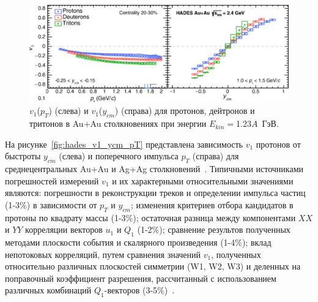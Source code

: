 \begin{figure}[h]
\begin{center}
\includegraphics[width=0.75\linewidth]{images/HADES_prl.png}
\caption{$v_1$($p_T$) (слева) и  $v_1$($y_{cm}$) (справа)  для протонов, дейтронов и тритонов  в  Au+Au столкновениях при
  энергии $E_{kin}=$1.23$A$~ГэВ.}
\label{fig:hades_prl}
\end{center}
\end{figure}

На рисунке~\ref{fig:hades_v1_ycm_pT} представлена зависимость  $v_1$ протонов от быстроты  $y_{cm}$  (слева) и поперечного импульса $p_T$ (справа) для среднецентральных Au+Au  и  Ag+Ag  столкновений~\cite{Mamaev:2024-1, Mamaev:2024-2}. 
Типичными источниками погрешностей измерений $v_1$ и их характерными относительными значениями являются: 
погрешности в реконструкции треков и определении импульса частиц (1-3\%) в зависимости от $p_T$ и $y_{cm}$; 
из­менения критериев отбора кандидатов в протоны по квадрату массы (1-3\%); 
остаточная  разница между компонентами $XX$ и $YY$ корреляции векторов $u_1$ и $Q_1$ (1-2\%);
сравнение результов полученных методами плоскости события и скалярного произведения (1-4\%); 
вклад непотоковых корреляций, путем сравнения значений $v_1$, полученных относительно различных плоскостей симметрии (W1, W2, W3) и деленных на поправочный коэффициент разрешения, рассчитанный с использованием различных комбинаций $Q_1$-векторов (3-5\%)~\cite{Mamaev:2020lpi, HADES:2020lob,Mamaev:2020qom}.

